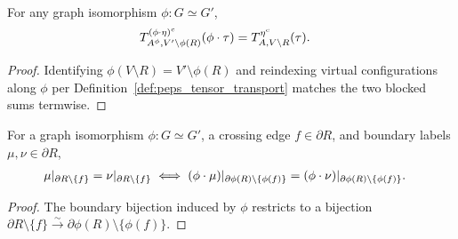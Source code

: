 
\begin{lemma}%
    \label{thm:peps_regionComplementWeight_transport}
    \leanok
    For any graph isomorphism $\phi:G\simeq G'$,
    \begin{align}
        T_{A^\phi,V'\setminus\phi(R)}^{(\phi\cdot\eta)^c}(\phi\cdot\tau)
         & =T_{A,V\setminus R}^{\eta^c}(\tau).
        \notag
    \end{align}
\end{lemma}
\begin{proof}\leanok
    Identifying $\phi(V\setminus R)=V'\setminus\phi(R)$ and reindexing virtual
    configurations along $\phi$ per Definition~\ref{def:peps_tensor_transport}
    matches the two blocked sums termwise.
\end{proof}

\begin{lemma}%
    \label{thm:peps_sameAwayFromBond_regionBoundaryConfigMap}
    \leanok
    For a graph isomorphism $\phi:G\simeq G'$, a crossing edge $f\in\partial R$,
    and boundary labels $\mu,\nu\in\partial R$,
    \begin{align}
        \mu|_{\partial R\setminus\{f\}}=\nu|_{\partial R\setminus\{f\}}
         & \iff
        (\phi\cdot\mu)|_{\partial\phi(R)\setminus\{\phi(f)\}}
        =(\phi\cdot\nu)|_{\partial\phi(R)\setminus\{\phi(f)\}}.
        \notag
    \end{align}
\end{lemma}
\begin{proof}\leanok
    The boundary bijection induced by $\phi$ restricts to a bijection
    $\partial R\setminus\{f\}\xrightarrow{\sim}\partial\phi(R)\setminus\{\phi(f)\}$.
\end{proof}

